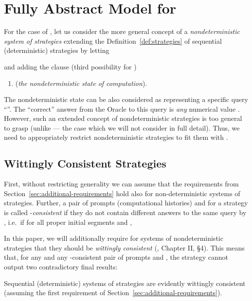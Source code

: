 \documentclass[fleqn]{LMCS}
\theoremstyle{plain}\newtheorem{satz}[thm]{Satz}
\theoremstyle{plain}\newtheorem{hyp}[thm]{Hypothesis}
\theoremstyle{plain}\newtheorem{hyps}[thm]{Hypotheses}
\theoremstyle{definition}\newtheorem{note}[thm]{Note}
\newcommand{\?}{\mbox{?}}
\begin{document}
\section{Fully Abstract Model for \texorpdfstring{}{PCF+}}
\label{sec:full-abstr-PCF+}

\noindent
For the case of , let us consider the more general 
concept of a \emph{nondeterministic system of 
strategies} \cite{Saz76SMZH} extending the Definition~\ref{def:strategies}
of sequential (deterministic) strategies by letting 

and adding the clause (third possibility for )
\begin{enumerate}[(1)]
\item  (\emph{the nondeterministic state of computation}).
\end{enumerate}
The nondeterministic state can be also considered as representing a specific query 
``''. The ``correct'' answer from the Oracle to this query 
is \emph{any} numerical value . 
However, such an extended concept of nondeterministic strategies 
is too general to grasp  
(unlike  --- the case which we will not consider 
in full detail). 
Thus, we need to appropriately restrict nondeterministic strategies 
to fit them with . 


\subsection{Wittingly Consistent Strategies}
\label{sec:wittingly-cons}

\noindent
First, without restricting generality we can assume that the 
requirements from Section~\ref{sec:additional-requirements} 
hold also for non-deterministic systems of strategies. 
Further, a pair of prompts (computational histories) 
 and  
for a strategy  is called -\emph{consistent}  
if they do not contain different answers 
to the same query by , i.e.\ if 
for all proper initial segments 
 and , 
 
In this paper, we will additionally require for systems of 
nondeterministic strategies  that they 
should be 
\emph{wittingly consistent} (\cite{Saz76t}, Chapter II, \S4). 
This means 
that, for any  and any -consistent pair 
of prompts  and , the strategy  cannot output two contradictory 
final results:

Sequential (deterministic) systems of strategies are evidently 
wittingly consistent (assuming the first requirement 
of Section~\ref{sec:additional-requirements}). 
\end{document}
